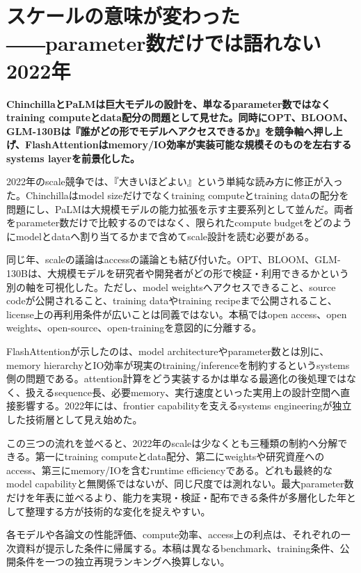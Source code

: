 \section{スケールの意味が変わった――parameter数だけでは語れない2022年}
\noindent\textbf{ChinchillaとPaLMは巨大モデルの設計を、単なるparameter数ではなくtraining computeとdata配分の問題として見せた。同時にOPT、BLOOM、GLM-130Bは『誰がどの形でモデルへアクセスできるか』を競争軸へ押し上げ、FlashAttentionはmemory/IO効率が実装可能な規模そのものを左右するsystems layerを前景化した。}\autocite{src-1f2518a3517b,src-4dd33abe1509,src-6ef0db0953a1,src-6ffa5c4e64ca,src-7823be169a27,src-93a582f1513c,src-99fae124f43c,src-be136777aa4f,src-d6fb00ab1ec9,src-e8da8e8f02bc}

2022年のscale競争では、『大きいほどよい』という単純な読み方に修正が入った。Chinchillaはmodel sizeだけでなくtraining computeとtraining dataの配分を問題にし、PaLMは大規模モデルの能力拡張を示す主要系列として並んだ。両者をparameter数だけで比較するのではなく、限られたcompute budgetをどのようにmodelとdataへ割り当てるかまで含めてscale設計を読む必要がある。\autocite{src-1f2518a3517b,src-6ffa5c4e64ca,src-7823be169a27,src-e8da8e8f02bc}


同じ年、scaleの議論はaccessの議論とも結び付いた。OPT、BLOOM、GLM-130Bは、大規模モデルを研究者や開発者がどの形で検証・利用できるかという別の軸を可視化した。ただし、model weightsへアクセスできること、source codeが公開されること、training dataやtraining recipeまで公開されること、license上の再利用条件が広いことは同義ではない。本稿ではopen access、open weights、open-source、open-trainingを意図的に分離する。\autocite{src-4dd33abe1509,src-6ef0db0953a1,src-93a582f1513c,src-99fae124f43c,src-d6fb00ab1ec9}


FlashAttentionが示したのは、model architectureやparameter数とは別に、memory hierarchyとIO効率が現実のtraining/inferenceを制約するというsystems側の問題である。attention計算をどう実装するかは単なる最適化の後処理ではなく、扱えるsequence長、必要memory、実行速度といった実用上の設計空間へ直接影響する。2022年には、frontier capabilityを支えるsystems engineeringが独立した技術層として見え始めた。\autocite{src-be136777aa4f}


この三つの流れを並べると、2022年のscaleは少なくとも三種類の制約へ分解できる。第一にtraining computeとdata配分、第二にweightsや研究資産へのaccess、第三にmemory/IOを含むruntime efficiencyである。どれも最終的なmodel capabilityと無関係ではないが、同じ尺度では測れない。最大parameter数だけを年表に並べるより、能力を実現・検証・配布できる条件が多層化した年として整理する方が技術的な変化を捉えやすい。\autocite{src-1f2518a3517b,src-4dd33abe1509,src-6ef0db0953a1,src-6ffa5c4e64ca,src-7823be169a27,src-93a582f1513c,src-99fae124f43c,src-be136777aa4f,src-d6fb00ab1ec9,src-e8da8e8f02bc}


\begin{claimboundary}
各モデルや各論文の性能評価、compute効率、access上の利点は、それぞれの一次資料が提示した条件に帰属する。本稿は異なるbenchmark、training条件、公開条件を一つの独立再現ランキングへ換算しない。\autocite{src-6ffa5c4e64ca,src-be136777aa4f,src-e8da8e8f02bc}
\end{claimboundary}
